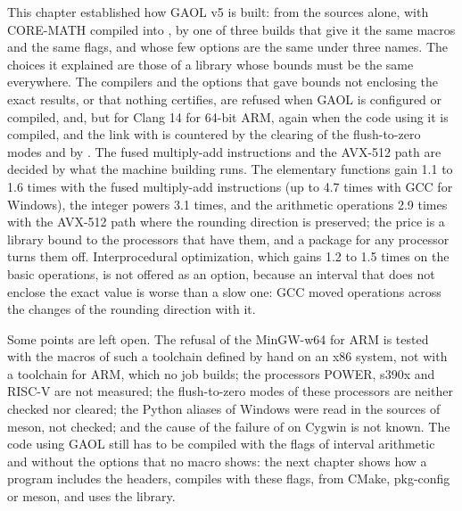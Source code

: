This chapter established how GAOL v5 is built: from the sources alone, with
CORE-MATH compiled into , by one of three builds that give it
the same macros and the same flags, and whose few options are the same under
three names. The choices it explained are those of a library whose bounds
must be the same everywhere. The compilers and the options that gave bounds
not enclosing the exact results, or that nothing certifies, are refused when
GAOL is configured or compiled, and, but for Clang 14 for 64-bit ARM, again when the code using it is compiled,
and the link with  is countered by the clearing of
the flush-to-zero modes and by . The fused multiply-add
instructions and the AVX-512 path are decided by what the machine building
runs. The elementary functions gain 1.1 to 1.6 times with the fused
multiply-add instructions (up to 4.7 times with GCC for Windows), the integer
powers 3.1 times, and the arithmetic
operations 2.9 times with the AVX-512 path where the rounding direction is
preserved; the price is a library bound to the processors that have them, and
a package for any processor turns them off. Interprocedural
optimization, which gains 1.2 to 1.5 times on the basic operations, is
not offered as an option, because an interval that does not enclose the exact
value is worse than a slow one: GCC moved operations across the changes of the
rounding direction with it.

\medskip
Some points are left open. The refusal of the MinGW-w64 for ARM
is tested with the macros of such a toolchain defined by hand on an x86
system, not with a toolchain for ARM, which no job builds; the processors POWER, s390x and RISC-V are not measured;
the flush-to-zero modes of these processors are neither checked nor cleared;
the Python aliases of Windows were read in the sources of meson, not checked;
and the cause of the failure of  on Cygwin is not known.
The code using GAOL still has to be compiled with the flags of interval
arithmetic and without the options that no macro shows: the next chapter
shows how a program includes the headers, compiles with these flags, from
CMake, pkg-config or meson, and uses the library.
